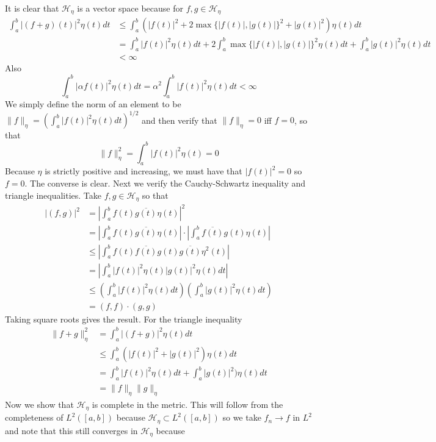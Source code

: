\documentclass{article}
\newcommand{\problem}[1]{\noindent{\textbf{Problem #1}}\\}
\newcommand{\problempart}[1]{\noindent{\textbf{(#1)}}}
\newcommand{\norm}[1]{\|#1\|}
\begin{document}
\problem{4.7.8}
\problempart{a} It is clear that $\mathcal{H}_\eta$ is a vector space because for $f,g \in \mathcal{H}_\eta$ 
\begin{align*}
\int_{a}^b |(f+g)(t)|^2\eta(t)dt &\leq \int_a^b (|f(t)|^2 + 2\max\{|f(t)|, |g(t)|\}^2 + |g(t)|^2)\eta(t)dt \\
&= \int_a^b |f(t)|^2\eta(t)dt + 2\int_a^b \max\{|f(t)|, |g(t)|\}^2\eta(t)dt + \int_a^b |g(t)|^2\eta(t)dt \\
&< \infty
\end{align*}
Also
\[
\int_a^b |\alpha f(t)|^2\eta(t)dt = \alpha^2 \int_a^b |f(t)|^2\eta(t)dt < \infty
\]
We simply define the norm of an element to be $\norm{f}_\eta = (\int_a^b |f(t)|^2\eta(t)dt)^{1/2}$ and then verify that $\norm{f}_\eta = 0$ iff $f = 0$, so that
\[
\norm{f}_\eta^2 = \int_a^b |f(t)|^2\eta(t) = 0 
\]
Because $\eta$ is strictly positive and increasing, we must have that $|f(t)|^2 = 0$ so $f = 0$. The converse is clear. Next we verify the Cauchy-Schwartz inequality and triangle inequalities. Take $f,g \in \mathcal{H}_\eta$ so that
\begin{align*}
|(f,g)|^2 &= \left|\int_a^bf(t)\overline{g(t)}\eta(t)\right|^2 \\
&=  \left|\int_a^bf(t)\overline{g(t)}\eta(t)\right|\cdot \left|\int_a^b\overline{f(t)}g(t)\eta(t)\right|\\
&\leq \left|\int_a^b f(t)\overline{f(t)}g(t)\overline{g(t)}\eta^2(t)\right| \\
&= \left|\int_a^b |f(t)|^2\eta(t)|g(t)|^2\eta(t)dt\right| \\
&\leq \left(\int_a^b |f(t)|^2\eta(t)dt\right)\left(\int_a^b |g(t)|^2\eta(t)dt\right) \\
&= (f,f) \cdot (g,g)
\end{align*} 
Taking square roots gives the result. For the triangle inequality
\begin{align*}
\norm{f + g}_\eta^2 &= \int_a^b|(f + g)|^2\eta(t)dt \\
&\leq \int_a^b (|f(t)|^2 + |g(t)|^2)\eta(t)dt \\
&= \int_a^b |f(t)|^2\eta(t)dt + \int_a^b|g(t)|^2)\eta(t)dt \\
&= \norm{f}_\eta\norm{g}_\eta
\end{align*}
Now we show that $\mathcal{H}_\eta$ is complete in the metric. This will follow from the completeness of $L^2([a,b])$ because $\mathcal{H}_\eta \subset L^2([a,b])$ so we take $f_n \to f$ in $L^2$ and note that this still converges in $\mathcal{H}_\eta$ because
\end{document}
